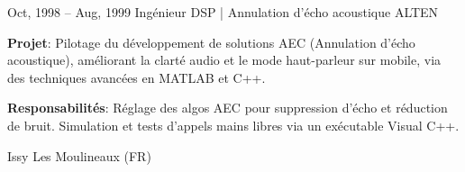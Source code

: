 \documentclass[
  a4paper,
   maincolor=cvblue,
   sectioncolor=cvblue,
   sidebarwidth=0.323\paperwidth,
]{fortysecondscv}
\begin{document}
\begin{cvtableNew}
    \cvitemRightNew
    {Oct, 1998 – Aug, 1999} %
    {Ingénieur DSP | Annulation d’écho acoustique} %
    {ALTEN} %
    {
      \vspace{1pt}
      \fontsize{10.8pt}{12pt}\selectfont %
      \textbf{Projet}: Pilotage du développement de solutions AEC (Annulation d’écho acoustique), améliorant la clarté audio et le mode haut-parleur sur mobile, via des techniques avancées en MATLAB et C++.\par
      \vspace{3.6pt}
      \textbf{Responsabilités}: Réglage des algos AEC pour suppression d’écho et réduction de bruit. Simulation et tests d’appels mains libres via un exécutable Visual C++.
    }
    {Issy Les Moulineaux (FR)} %


\end{cvtableNew}
\end{document}
